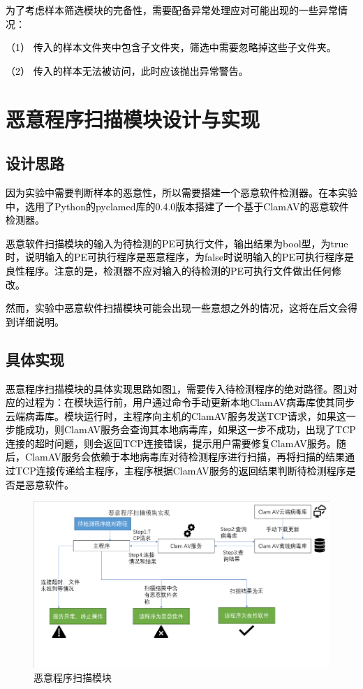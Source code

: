\textcolor{black}{为了考虑样本筛选模块的完备性，需要配备异常处理应对可能出现的一些异常情况：}

\textcolor{black}{（1）	传入的样本文件夹中包含子文件夹，筛选中需要忽略掉这些子文件夹。}

\textcolor{black}{（2）	传入的样本无法被访问，此时应该抛出异常警告。}

\section{恶意程序扫描模块设计与实现}

\subsection{设计思路}

\textcolor{black}{因为实验中需要判断样本的恶意性，所以需要搭建一个恶意软件检测器。在本实验中，选用了Python的pyclamed库的0.4.0版本搭建了一个基于ClamAV的恶意软件检测器。}

\textcolor{black}{恶意软件扫描模块的输入为待检测的PE可执行文件，输出结果为bool型，为true时，说明输入的PE可执行程序是恶意程序，为false时说明输入的PE可执行程序是良性程序。注意的是，检测器不应对输入的待检测的PE可执行文件做出任何修改。}

\textcolor{black}{然而，实验中恶意软件扫描模块可能会出现一些意想之外的情况，这将在后文会得到详细说明。}

\subsection{具体实现}

\textcolor{black}{恶意程序扫描模块的具体实现思路如图\ref{fig:malware_scan_module}，需要传入待检测程序的绝对路径。图\ref{fig:malware_scan_module}对应的过程为：在模块运行前，用户通过命令手动更新本地ClamAV病毒库使其同步云端病毒库。模块运行时，主程序向主机的ClamAV服务发送TCP请求，如果这一步能成功，则ClamAV服务会查询其本地病毒库，如果这一步不成功，出现了TCP连接的超时问题，则会返回TCP连接错误，提示用户需要修复ClamAV服务。随后，ClamAV服务会依赖于本地病毒库对待检测程序进行扫描，再将扫描的结果通过TCP连接传递给主程序，主程序根据ClamAV服务的返回结果判断待检测程序是否是恶意软件。}

\begin{figure}
  \centering
  \includegraphics[]{images/malware_scan_module.png}
  \caption{恶意程序扫描模块}\label{fig:malware_scan_module}
\end{figure}

